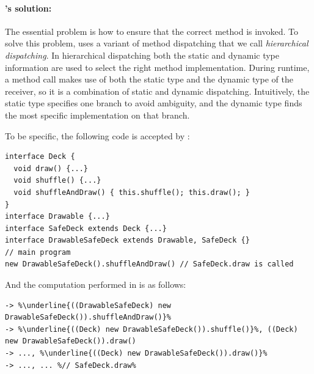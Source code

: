 \paragraph{\MIM's solution:} 
The essential problem is how to ensure that the correct method is
invoked. To solve this problem, \MIM{} uses a variant of method
dispatching that we call \textit{hierarchical dispatching}. In
hierarchical dispatching both the static and dynamic type information 
are used to select the right method implementation.
During runtime, a method call
makes use of both the static type and the dynamic type of the
receiver, so it is a
combination of static and dynamic dispatching. Intuitively, the static type specifies one branch
to avoid ambiguity, and the dynamic type finds the most specific implementation on that branch.

To be specific, the following code is accepted by \MIM{}:
\vspace{3pt}\begin{lstlisting}
interface Deck {
  void draw() {...}
  void shuffle() {...}
  void shuffleAndDraw() { this.shuffle(); this.draw(); }
}
interface Drawable {...}
interface SafeDeck extends Deck {...}
interface DrawableSafeDeck extends Drawable, SafeDeck {}
// main program
new DrawableSafeDeck().shuffleAndDraw() // SafeDeck.draw is called
\end{lstlisting}\vspace{3pt}
And the computation performed in \MIM{} is as follows:
\vspace{3pt}\begin{lstlisting}[style=reduction, escapechar=\%]
   %\underline{new DrawableSafeDeck()}%.shuffleAndDraw()
-> %\underline{((DrawableSafeDeck) new DrawableSafeDeck()).shuffleAndDraw()}%
-> %\underline{((Deck) new DrawableSafeDeck()).shuffle()}%, ((Deck) new DrawableSafeDeck()).draw()
-> ..., %\underline{((Deck) new DrawableSafeDeck()).draw()}%
-> ..., ... %// SafeDeck.draw%
\end{lstlisting}\vspace{3pt}

